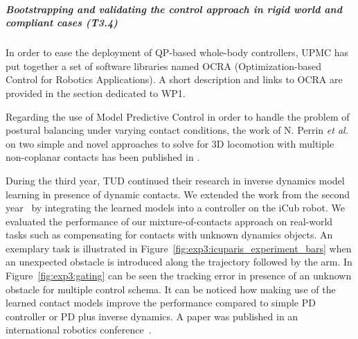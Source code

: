  
\subparagraph*{Bootstrapping and validating the control approach in rigid world and compliant cases (T3.4)}
 
In order to ease the deployment of QP-based whole-body controllers, UPMC has put together a set of software libraries named OCRA (Optimization-based Control for Robotics Applications). A short description and links to OCRA are provided in the section dedicated to WP1.

Regarding the use of Model Predictive Control in order to handle the problem of postural balancing under varying contact conditions, the work of N. Perrin \textit{et al.} on two simple and novel approaches to solve for 3D locomotion with multiple non-coplanar contacts has been published in \cite{perrin_ISRR2015}.

During the third year, TUD continued their research in inverse dynamics model learning in presence of dynamic contacts. 
We extended the work from the second year~\cite{Calandra_ICRA15} by integrating the learned models into a controller on the iCub robot.
We evaluated the performance of our mixture-of-contacts approach on real-world tasks such as compensating for contacts with unknown dynamics objects.
An exemplary task is illustrated in Figure~\ref{fig:exp3:icuparis_experiment_bars} when an unexpected obstacle is introduced along the trajectory followed by the arm.
In Figure~\ref{fig:exp3:gating} can be seen the tracking error in presence of an unknown obstacle for multiple control schema. 
It can be noticed how making use of the learned contact models improve the performance compared to simple PD controller or PD plus inverse dynamics.
A paper was published in an international robotics conference~\cite{calandra2015learning}.



